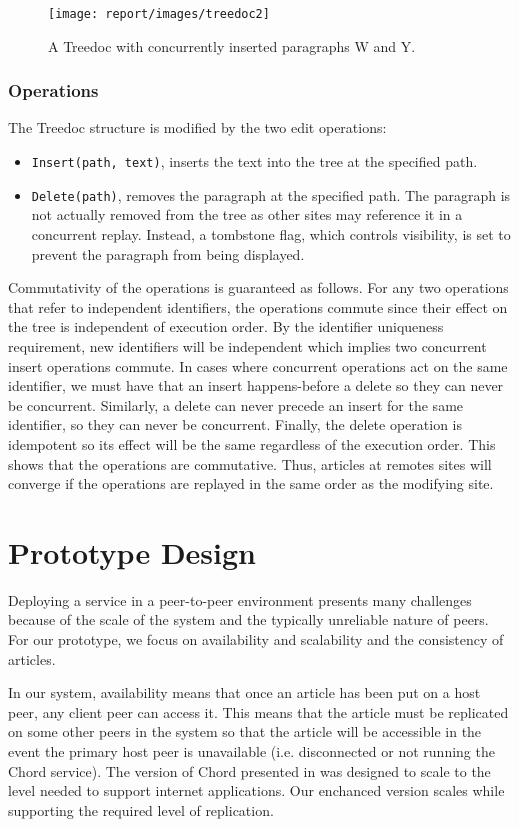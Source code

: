 \documentclass[twocolumn]{article}
\begin{document}
\begin{figure}[tbh!]
  \centering
  \texttt{[image: report/images/treedoc2]}
  \caption{A Treedoc with concurrently inserted paragraphs W and Y. \label{fig:treedoc_full}}
\end{figure}

\subsubsection{Operations}
The Treedoc structure is modified by the two edit operations:
\begin{itemize}
  \item \texttt{Insert(path, text)}, inserts the text into the tree at the specified path.
  \item \texttt{Delete(path)}, removes the paragraph at the specified path. The paragraph is not actually removed from the tree as other sites may reference it in a concurrent replay. Instead, a tombstone flag, which controls visibility, is set to prevent the paragraph from being displayed.
\end{itemize}

Commutativity of the operations is guaranteed as follows. For any two operations that refer to independent identifiers, the operations commute since their effect on the tree is independent of execution order. By the identifier uniqueness requirement, new identifiers will be independent which implies two concurrent insert operations commute. In cases where concurrent operations act on the same identifier, we must have that an insert happens-before a delete so they can never be concurrent. Similarly, a delete can never precede an insert for the same identifier, so they can never be concurrent. Finally, the delete operation is idempotent so its effect will be the same regardless of the execution order. This shows that the operations are commutative. Thus, articles at remotes sites will converge if the operations are replayed in the same order as the modifying site.


\section{Prototype Design}
Deploying a service in a peer-to-peer environment presents many challenges because of the scale of the system and the typically unreliable nature of peers. For our prototype, we focus on availability and scalability and the consistency of articles.

In our system, availability means that once an article has been put on a host peer, any client peer can access it. This means that the article must be replicated on some other peers in the system so that the article will be accessible in the event the primary host peer is unavailable (i.e. disconnected or not running the Chord service). The version of Chord presented in \cite{c1} was designed to scale to the level needed to support internet applications. Our enchanced version scales while supporting the required level of replication.
\end{document}
